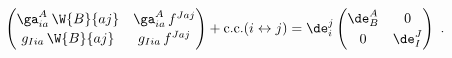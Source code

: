 \begin{equation}
  \begin{pmatrix} \ga_{ia}^A\, \W{B}{aj} & \ga_{ia}^A\, f^{Jaj} \\[2pt]
  g_{Iia}\, \W{B}{aj} & g_{Iia}\, f^{Jaj} \end{pmatrix} + \text{c.c.}
  (i \leftrightarrow j) = \de_i^j \begin{pmatrix} \de_B^A & 0 \\[2pt]
  0 & \de_I^J \end{pmatrix}\ . \label{rel2}
 \end{equation}

